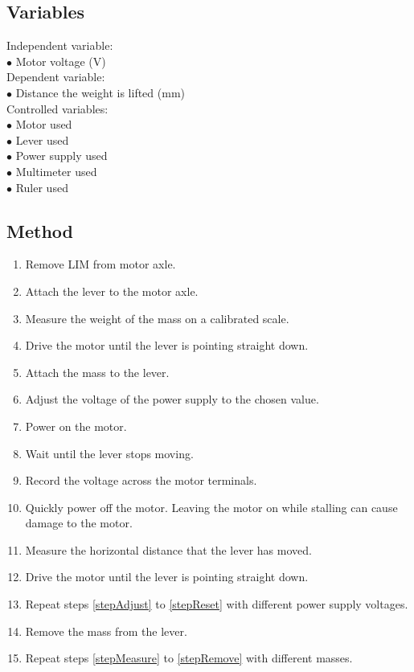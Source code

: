 \subsection{Variables}
Independent variable:\\
$\bullet$ Motor voltage (V)\\
Dependent variable:\\
$\bullet$ Distance the weight is lifted (mm)\\
Controlled variables:\\
$\bullet$ Motor used\\
$\bullet$ Lever used\\
$\bullet$ Power supply used\\
$\bullet$ Multimeter used\\
$\bullet$ Ruler used\\

\subsection{Method}

\begin{enumerate}
	\item Remove LIM from motor axle.
	\item Attach the lever to the motor axle.
	\item Measure the weight of the mass on a calibrated scale. \label{stepMeasure}
	\item Drive the motor until the lever is pointing straight down.
	\item Attach the mass to the lever.
	\item Adjust the voltage of the power supply to the chosen value. \label{stepAdjust}
	\item Power on the motor.
	\item Wait until the lever stops moving.
	\item Record the voltage across the motor terminals. 
	\item Quickly power off the motor. Leaving the motor on while stalling can cause damage to the motor.
	\item Measure the horizontal distance that the lever has moved.
	\item Drive the motor until the lever is pointing straight down. \label{stepReset}
	\item Repeat steps \ref{stepAdjust} to \ref{stepReset} with different power supply voltages.
	\item Remove the mass from the lever. \label{stepRemove}
	\item Repeat steps \ref{stepMeasure} to \ref{stepRemove} with different masses.
\end{enumerate}
